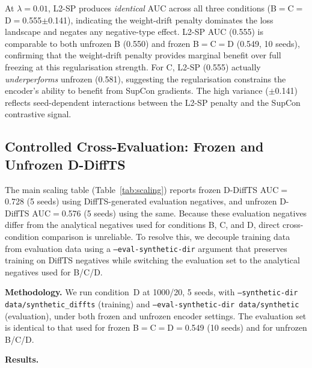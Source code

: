 At $\lambda{=}0.01$, L2-SP produces \emph{identical} AUC across all three
conditions (B$=$C$=$D$=$0.555$\pm$0.141), indicating the weight-drift penalty
dominates the loss landscape and negates any negative-type effect.
L2-SP AUC (0.555) is comparable to both unfrozen B (0.550) and frozen
B$=$C$=$D (0.549, 10 seeds), confirming that the weight-drift penalty
provides marginal benefit over full freezing at this regularisation strength.
For C, L2-SP (0.555) actually \emph{underperforms} unfrozen (0.581),
suggesting the regularisation constrains the encoder's ability to benefit
from SupCon gradients.
The high variance ($\pm$0.141) reflects seed-dependent interactions between
the L2-SP penalty and the SupCon contrastive signal.

\subsection{Controlled Cross-Evaluation: Frozen and Unfrozen D-DiffTS}
\label{app:controlled_frozen}

The main scaling table (Table~\ref{tab:scaling}) reports frozen D-DiffTS
AUC$=$0.728 (5 seeds) using DiffTS-generated evaluation negatives,
and unfrozen D-DiffTS AUC$=$0.576 (5 seeds) using the same.
Because these evaluation negatives differ from the analytical negatives used
for conditions B, C, and D, direct cross-condition comparison is unreliable.
To resolve this, we decouple training data from evaluation data using a
\texttt{--eval-synthetic-dir} argument that preserves training on DiffTS negatives
while switching the evaluation set to the analytical negatives used for B/C/D.

\textbf{Methodology.}
We run condition~D at 1000/20, 5 seeds, with
\texttt{--synthetic-dir data/synthetic\_diffts} (training) and
\texttt{--eval-synthetic-dir data/synthetic} (evaluation),
under both frozen and unfrozen encoder settings.
The evaluation set is identical to that used for frozen B$=$C$=$D$=$0.549
(10 seeds) and for unfrozen B/C/D.

\textbf{Results.}

